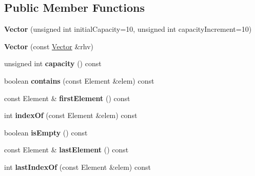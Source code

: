 \subsection*{Public Member Functions}
\begin{DoxyCompactItemize}
\item 
\hypertarget{class_vector_ae5c978a3b9b3e82a043634c89876e102}{}{\bfseries Vector} (unsigned int initial\+Capacity=10, unsigned int capacity\+Increment=10)\label{class_vector_ae5c978a3b9b3e82a043634c89876e102}

\item 
\hypertarget{class_vector_ab04097bf909acc96be66758633e489fe}{}{\bfseries Vector} (const \hyperlink{class_vector}{Vector} \&rhv)\label{class_vector_ab04097bf909acc96be66758633e489fe}

\item 
\hypertarget{class_vector_a792f454110aa9e657f2f56d42e94de9e}{}unsigned int {\bfseries capacity} () const \label{class_vector_a792f454110aa9e657f2f56d42e94de9e}

\item 
\hypertarget{class_vector_acf9315fe305c1a9835fcd792ecdf9e21}{}boolean {\bfseries contains} (const Element \&elem) const \label{class_vector_acf9315fe305c1a9835fcd792ecdf9e21}

\item 
\hypertarget{class_vector_a860b7955a03e9f752ae82af3f28c20c6}{}const Element \& {\bfseries first\+Element} () const \label{class_vector_a860b7955a03e9f752ae82af3f28c20c6}

\item 
\hypertarget{class_vector_a03d040fd3f6b49f6d5478c370863c0be}{}int {\bfseries index\+Of} (const Element \&elem) const \label{class_vector_a03d040fd3f6b49f6d5478c370863c0be}

\item 
\hypertarget{class_vector_ae9160c6ebad0d726b7e545c93b68be95}{}boolean {\bfseries is\+Empty} () const \label{class_vector_ae9160c6ebad0d726b7e545c93b68be95}

\item 
\hypertarget{class_vector_a0cefeccf072907cd1b5ee7a019b4c284}{}const Element \& {\bfseries last\+Element} () const \label{class_vector_a0cefeccf072907cd1b5ee7a019b4c284}

\item 
\hypertarget{class_vector_abaf3f336079ed9bce5376e2549f7ff5c}{}int {\bfseries last\+Index\+Of} (const Element \&elem) const \label{class_vector_abaf3f336079ed9bce5376e2549f7ff5c}


\end{DoxyCompactItemize}
